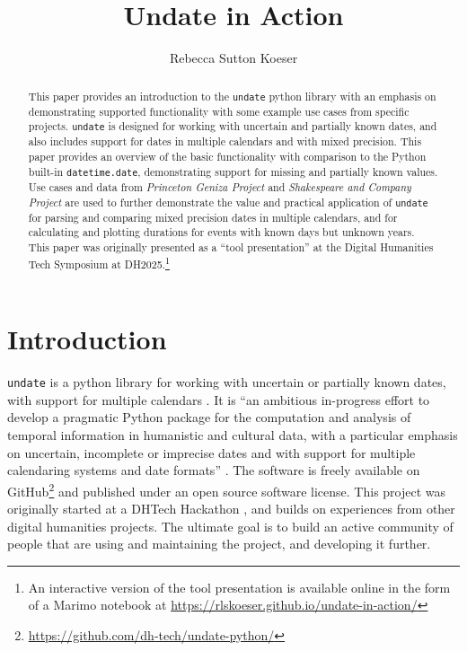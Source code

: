 \documentclass[final]{anthology-ch} %
\title{Undate in Action}
\author[1]{Rebecca Sutton Koeser}[
  orcid=0000-0002-8762-8057
]
\affiliation{1}{Center for Digital Humanities, Princeton University, Princeton, New Jersey, USA}
\begin{document}
\maketitle

\begin{abstract}
This paper provides an introduction to the \texttt{undate} python library with an emphasis on demonstrating supported functionality with some example use cases from specific projects. \texttt{undate} is designed for working with uncertain and partially known dates, and also includes support for dates in multiple calendars and with mixed precision. This paper provides an overview of the basic functionality with comparison to the Python built-in \texttt{datetime.date}, demonstrating support for missing and partially known values. Use cases and data from \textit{Princeton Geniza Project} and \textit{Shakespeare and Company Project} are used to further demonstrate the value and practical application of \texttt{undate} for parsing and comparing mixed precision dates in multiple calendars, and for calculating and plotting durations for events with known days but unknown years. This paper was originally presented as a ``tool presentation'' at the Digital Humanities Tech Symposium at DH2025.\footnote{An interactive version of the tool presentation is available online in the form of a Marimo notebook at \href{https://rlskoeser.github.io/undate-in-action/}{https://rlskoeser.github.io/undate-in-action/}}
\end{abstract}

\section{Introduction} 

\texttt{undate} is a python library for working with uncertain or partially known dates, with support for multiple calendars \cite{koeser_undate_python_2025}. It is ``an ambitious in-progress effort to develop a pragmatic Python package for the computation and analysis of temporal information in humanistic and cultural data, with a particular emphasis on uncertain, incomplete or imprecise dates and with support for multiple calendaring systems and date formats'' \cite{koeser_undate_2025}. The software is freely available on GitHub\footnote{\url{https://github.com/dh-tech/undate-python/}} and published under an open source software license. This project was originally started at a DHTech Hackathon \cite{koeser_join_2023}, and builds on experiences from other digital humanities projects. The ultimate goal is to build an active community of people that are using and maintaining the project, and developing it further.
\end{document}
